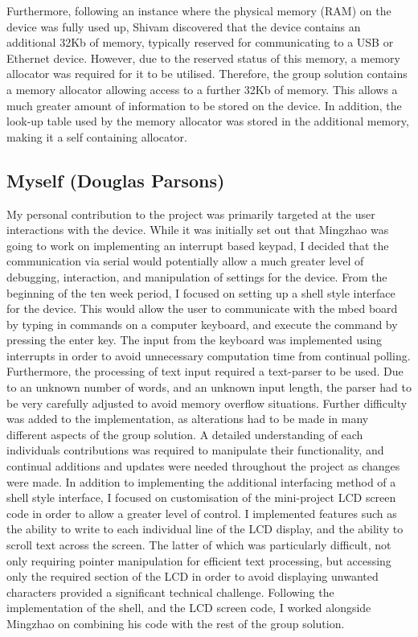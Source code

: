 Furthermore, following an 
instance where the physical memory (RAM) on the device was fully used up, Shivam 
discovered that the device contains an additional 32Kb of memory, 
typically reserved for communicating to a USB or Ethernet device. However, 
due to the reserved status of this memory, a memory allocator was required for 
it to be utilised. 
Therefore, the group solution contains a memory allocator allowing access to 
a further 32Kb of memory. This allows a much greater amount of information to be 
stored on the device. 
In addition, the look-up table used by the memory allocator was stored in the 
additional memory, making it a self containing allocator. 

\subsection*{Myself (Douglas Parsons)}

My personal contribution to the project was primarily targeted at the user 
interactions with the device. While it was initially set out that Mingzhao was 
going to work on implementing an interrupt based keypad, I decided that the 
communication via serial would potentially allow a much greater level of 
debugging, interaction, and manipulation of settings for the device. From the 
beginning of the ten week period, I focused on setting up a shell style interface 
for the device. This would allow the user to communicate with the mbed board by 
typing in commands on a computer keyboard, and execute the command by pressing 
the enter key. The input from the keyboard was implemented using interrupts in 
order to avoid unnecessary computation time from continual polling. 
Furthermore, the processing of text input required a text-parser to be used. 
Due to an unknown number of words, and an unknown input length, the parser had 
to be very carefully adjusted to avoid memory overflow situations. Further 
difficulty was added to the implementation, as alterations had to be made in many 
different aspects of the group solution. A detailed understanding of each 
individuals contributions was required to manipulate their functionality, and 
continual additions and updates were needed throughout the project as changes 
were made. 
In addition to implementing the additional interfacing method of a shell style 
interface, I focused on customisation of the mini-project LCD screen code in 
order to allow a greater level of control. I implemented features such as the 
ability to write to each individual line of the LCD display, and the ability to 
scroll text across the screen. 
The latter of which was particularly difficult, not only requiring pointer 
manipulation for efficient text processing, but accessing only the required 
section of the LCD in order to avoid displaying unwanted characters provided 
a significant technical challenge. Following the implementation of the shell, and 
the LCD screen code, 
I worked alongside Mingzhao on combining his code with 
the rest of the group solution. 

